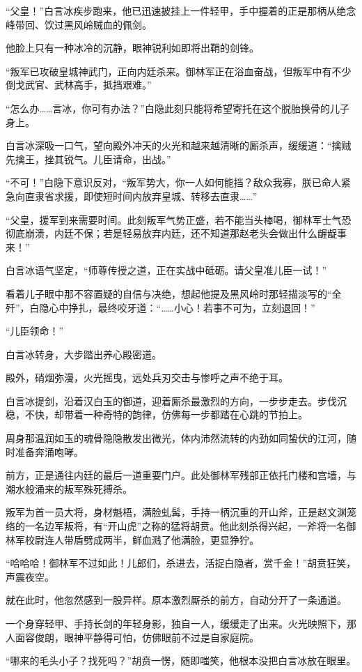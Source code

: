 “父皇！”白言冰疾步跑来，他已迅速披挂上一件轻甲，手中握着的正是那柄从绝念峰带回、饮过黑风岭贼血的佩剑。

他脸上只有一种冰冷的沉静，眼神锐利如即将出鞘的剑锋。

“叛军已攻破皇城神武门，正向内廷杀来。御林军正在浴血奋战，但叛军中有不少倒戈武官、武林高手，抵挡艰难。”

“怎么办……言冰，你可有办法？”白隐此刻只能将希望寄托在这个脱胎换骨的儿子身上。

白言冰深吸一口气，望向殿外冲天的火光和越来越清晰的厮杀声，缓缓道：“擒贼先擒王，挫其锐气。儿臣请命，出战。”

“不可！”白隐下意识反对，“叛军势大，你一人如何能挡？敌众我寡，朕已命人紧急向直隶省求援，即使短时间内放弃皇城、转移去直隶……”

“父皇，援军到来需要时间。此刻叛军气势正盛，若不能当头棒喝，御林军士气恐彻底崩溃，内廷不保；若是轻易放弃内廷，还不知道那赵老头会做出什么龌龊事来！”

白言冰语气坚定，“师尊传授之道，正在实战中砥砺。请父皇准儿臣一试！”

看着儿子眼中那不容置疑的自信与决绝，想起他提及黑风岭时那轻描淡写的“全歼”，白隐心中挣扎，最终咬牙道：“……小心！若事不可为，立刻退回！”

“儿臣领命！”

白言冰转身，大步踏出养心殿密道。

殿外，硝烟弥漫，火光摇曳，远处兵刃交击与惨呼之声不绝于耳。

白言冰提剑，沿着汉白玉的御道，迎着厮杀最激烈的方向，一步步走去。步伐沉稳，不快，却带着一种奇特的韵律，仿佛每一步都踏在心跳的节拍上。

周身那温润如玉的魂骨隐隐散发出微光，体内沛然流转的内劲如同蛰伏的江河，随时准备奔涌咆哮。

前方，正是通往内廷的最后一道重要门户。此处御林军残部正依托门楼和宫墙，与潮水般涌来的叛军殊死搏杀。

叛军为首一员大将，身材魁梧，满脸虬髯，手持一柄沉重的开山斧，正是赵文渊笼络的一名边军叛将，有“开山虎”之称的猛将胡贲。他此刻杀得兴起，一斧将一名御林军校尉连人带盾劈成两半，鲜血溅了他满脸，更显狰狞。

“哈哈哈！御林军不过如此！儿郎们，杀进去，活捉白隐者，赏千金！”胡贲狂笑，声震夜空。

就在此时，他忽然感到一股异样。原本激烈厮杀的前方，自动分开了一条通道。

一个身穿轻甲、手持长剑的年轻身影，独自一人，缓缓走了出来。火光映照下，那人面容俊朗，眼神平静得可怕，仿佛眼前不过是自家庭院。

“哪来的毛头小子？找死吗？”胡贲一愣，随即嗤笑，他根本没把白言冰放在眼里。

